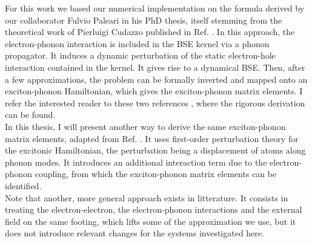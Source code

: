 For this work we based our numerical implementation on the formula derived by our collaborator Fulvio Paleari in his PhD thesis, \cite{paleari2019first} itself stemming from the theoretical work of Pierluigi Cudazzo published in Ref. \cite{cudazzo2020first}. In this approach, the electron-phonon interaction is included in the \acrshort{BSE} kernel via a phonon propagator. It induces a dynamic perturbation of the static electron-hole interaction contained in the kernel. It gives rise to a dynamical \acrlong{BSE}. Then, after a few approximations, the problem can be formally inverted and mapped onto an exciton-phonon Hamiltonian, which gives the exciton-phonon matrix elements. I refer the interested reader to these two references \cite{paleari2019first,cudazzo2020first}, where the rigorous derivation can be found.\\

In this thesis, I will present another way to derive the same exciton-phonon matrix elements, adapted from Ref. \cite{chen2020exciton}. It uses first-order perturbation theory for the excitonic Hamiltonian, the perturbation being a displacement of atoms along phonon modes. It introduces an additional interaction term due to the electron-phonon coupling, from which the exciton-phonon matrix elements can be identified. \\
Note that another, more general approach exists in litterature. It consists in treating the electron-electron, the electron-phonon interactions and the external field on the same footing,\cite{paleari2022exciton} which lifts some of the approximation we use, but it does not introduce relevant changes for the systems investigated here.\\

